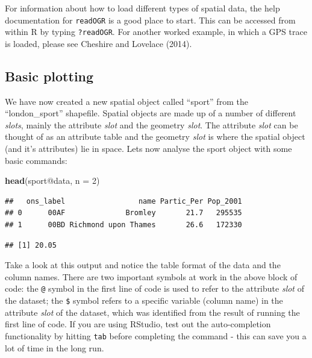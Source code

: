 \documentclass[]{article}
\newenvironment{Shaded}{}{}
\newcommand{\KeywordTok}[1]{\textcolor[rgb]{0.00,0.44,0.13}{\textbf{{#1}}}}
\newcommand{\DataTypeTok}[1]{\textcolor[rgb]{0.56,0.13,0.00}{{#1}}}
\newcommand{\DecValTok}[1]{\textcolor[rgb]{0.25,0.63,0.44}{{#1}}}
\newcommand{\NormalTok}[1]{{#1}}
\begin{document}
For information about how to load different types of spatial data, the
help documentation for \texttt{readOGR} is a good place to start. This
can be accessed from within R by typing \texttt{?readOGR}. For another
worked example, in which a GPS trace is loaded, please see Cheshire and
Lovelace (2014).

\subsection{Basic plotting}\label{basic-plotting}

We have now created a new spatial object called ``sport'' from the
``london\_sport'' shapefile. Spatial objects are made up of a number of
different \emph{slots}, mainly the attribute \emph{slot} and the
geometry \emph{slot}. The attribute \emph{slot} can be thought of as an
attribute table and the geometry \emph{slot} is where the spatial object
(and it's attributes) lie in space. Lets now analyse the sport object
with some basic commands:

\begin{Shaded}
\begin{Highlighting}[]
\KeywordTok{head}\NormalTok{(sport@data, }\DataTypeTok{n =} \DecValTok{2}\NormalTok{)}
\end{Highlighting}
\end{Shaded}

\begin{verbatim}
##   ons_label                 name Partic_Per Pop_2001
## 0      00AF              Bromley       21.7   295535
## 1      00BD Richmond upon Thames       26.6   172330
\end{verbatim}

\begin{Shaded}
\end{Shaded}

\begin{verbatim}
## [1] 20.05
\end{verbatim}

Take a look at this output and notice the table format of the data and
the column names. There are two important symbols at work in the above
block of code: the \texttt{@} symbol in the first line of code is used
to refer to the attribute \emph{slot} of the dataset; the \texttt{\$}
symbol refers to a specific variable (column name) in the attribute
\emph{slot} of the dataset, which was identified from the result of
running the first line of code. If you are using RStudio, test out the
auto-completion functionality by hitting \texttt{tab} before completing
the command - this can save you a lot of time in the long run.
\end{document}
